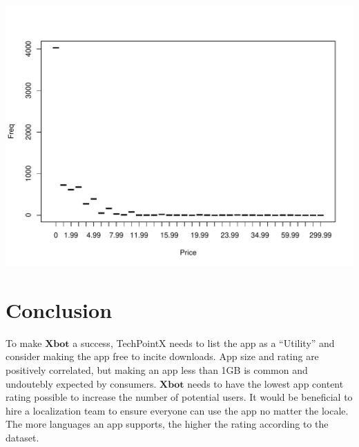 \documentclass[]{article}
\newenvironment{Shaded}{\begin{snugshade}}{\end{snugshade}}
\newcommand{\CommentTok}[1]{\textcolor[rgb]{0.56,0.35,0.01}{\textit{#1}}}
\newcommand{\DecValTok}[1]{\textcolor[rgb]{0.00,0.00,0.81}{#1}}
\newcommand{\KeywordTok}[1]{\textcolor[rgb]{0.13,0.29,0.53}{\textbf{#1}}}
\newcommand{\NormalTok}[1]{#1}
\newcommand{\OperatorTok}[1]{\textcolor[rgb]{0.81,0.36,0.00}{\textbf{#1}}}
\newcommand{\StringTok}[1]{\textcolor[rgb]{0.31,0.60,0.02}{#1}}
\begin{document}
\begin{Shaded}
\end{Shaded}

\begin{center}\includegraphics{Plots/analysis6-1} \end{center}

\hypertarget{conclusion}{%
\section{Conclusion}\label{conclusion}}

To make \(\textbf{Xbot}\) a success, TechPointX needs to list the app as
a ``Utility'' and consider making the app free to incite downloads. App
size and rating are positively correlated, but making an app less than
1GB is common and undoutebly expected by consumers. \(\textbf{Xbot}\)
needs to have the lowest app content rating possible to increase the
number of potential users. It would be beneficial to hire a localization
team to ensure everyone can use the app no matter the locale. The more
languages an app supports, the higher the rating according to the
dataset.
\end{document}
